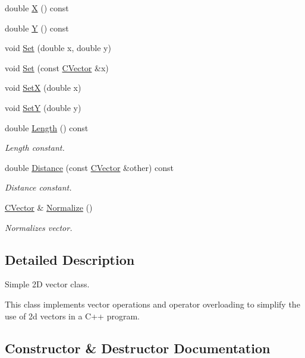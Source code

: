 \begin{DoxyCompactItemize}
double \mbox{\hyperlink{class_c_vector_adb4201d69d28335e4778db12a63334dd}{X}} () const
\item 
double \mbox{\hyperlink{class_c_vector_a2307d1e05707ac82685fc5b7ec92df22}{Y}} () const
\item 
void \mbox{\hyperlink{class_c_vector_a0d188ac1b8da71257bea3854d7f1f6b7}{Set}} (double x, double y)
\item 
void \mbox{\hyperlink{class_c_vector_a8478e276e69c84e9d10850bf0dd0a07a}{Set}} (const \mbox{\hyperlink{class_c_vector}{C\+Vector}} \&x)
\item 
void \mbox{\hyperlink{class_c_vector_a52453e778416ff304b9686389869e33c}{SetX}} (double x)
\item 
void \mbox{\hyperlink{class_c_vector_af4527b22d2d04f9218802b55c4a12f77}{SetY}} (double y)
\item 
double \mbox{\hyperlink{class_c_vector_ac5a1307d7d4fe0122fba34448483fd5d}{Length}} () const
\begin{DoxyCompactList}\small\item\em Length constant. \end{DoxyCompactList}\item 
double \mbox{\hyperlink{class_c_vector_a3b81ff3e8be09903b271d6712e1ffa0d}{Distance}} (const \mbox{\hyperlink{class_c_vector}{C\+Vector}} \&other) const
\begin{DoxyCompactList}\small\item\em Distance constant. \end{DoxyCompactList}\item 
\mbox{\hyperlink{class_c_vector}{C\+Vector}} \& \mbox{\hyperlink{class_c_vector_a843889621cc1fec46c763ed323f14628}{Normalize}} ()
\begin{DoxyCompactList}\small\item\em Normalizes vector. \end{DoxyCompactList}\end{DoxyCompactItemize}


\subsection{Detailed Description}
Simple 2D vector class. 

This class implements vector operations and operator overloading to simplify the use of 2d vectors in a C++ program. 

\subsection{Constructor \& Destructor Documentation}
\mbox{\label{class_c_vector_a4c3513341ee5fc6d1e98d8af801571b0}} 
